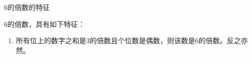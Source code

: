 \documentclass[aspectratio=169]{ctexbeamer} %
\date{\today}
\begin{document}
\begin{frame}[t]{6的倍数的特征}
\begin{spacing}{1.2}
\normalsize
6的倍数，具有如下特征：
\begin{enumerate}[label={\arabic*.}]
\item \alert{所有位上的数字之和是3的倍数且个位数是偶数，则该数是6的倍数。反之亦然。}
\end{enumerate}

\end{spacing}
\end{frame}
\end{document}

